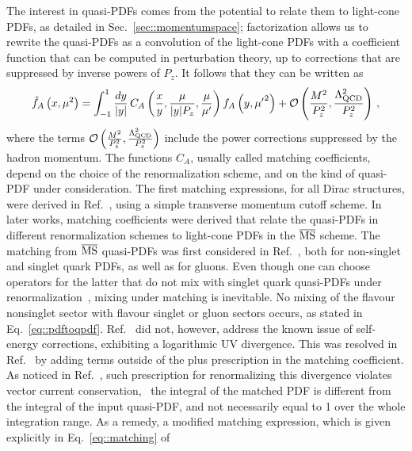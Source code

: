 The interest in quasi-PDFs comes from the potential to relate them to light-cone
PDFs, as detailed in Sec.~\ref{sec::momentumspace};
factorization allows us to rewrite the quasi-PDFs as a convolution of the
light-cone PDFs with a coefficient function that can be computed in perturbation
theory, up to corrections that are suppressed by inverse powers of $P_z$.
It follows that they can be written as
\begin{align}
	\label{eq::pdftoqpdf}                                                                             
	\tilde{f}_A\left( x , {\mu}^2 \right) =                                                               
	\int_{-1}^{1} \frac{dy}{|y|}\, C_A\left(\frac{x}{y},\frac{\mu}{|y|P_z},\frac{\mu}{\mu'} \right)  f_A\left( y, {\mu'}^2\right) 
	+ \mathcal{O}\left( \frac{M^2}{P_z^2},\frac{\Lambda^2_{\text{QCD}}}{P_z^2} \right)\, ,                   
\end{align}
where the terms $\mathcal{O}\left(
\frac{M^2}{P_z^2},\frac{\Lambda^2_{\text{QCD}}}{P_z^2} \right) $ include
the power corrections suppressed by the hadron momentum. The functions $C_A$,
usually called matching coefficients, depend on the choice of the
renormalization scheme, and on the kind of quasi-PDF under consideration. The
first matching expressions, for all Dirac structures, were derived in
Ref.~\cite{Xiong:2013bka}, using a simple transverse momentum cutoff scheme. In
later works, matching coefficients were derived that relate the quasi-PDFs in
different renormalization schemes to light-cone PDFs in the $\overline{\mathrm{MS}}$ scheme. The
matching from $\overline{\mathrm{MS}}$ quasi-PDFs was first considered in
Ref.~\cite{Wang:2017qyg}, both for non-singlet and singlet quark PDFs, as well
as for gluons. Even though one can choose operators for the latter that do not
mix with singlet quark quasi-PDFs under
renormalization~\cite{Zhang:2018diq,Li:2018tpe}, mixing under matching is
inevitable. 
No mixing of the flavour nonsinglet sector with flavour singlet or
gluon sectors occurs, as stated in Eq.~\eqref{eq::pdftoqpdf}. Ref.~\cite{Wang:2017qyg} did not, however, address the
known issue of self-energy corrections, exhibiting a logarithmic UV divergence.
This was resolved in Ref.~\cite{Izubuchi:2018srq} by adding terms outside of the
plus prescription in the matching coefficient. As noticed in
Ref.~\cite{Alexandrou:2018pbm}, such prescription for renormalizing this
divergence violates vector current conservation, \ie\ the integral of the
matched PDF is different from the integral of the input quasi-PDF, and not
necessarily equal to 1 over the whole integration range. As a remedy, a modified
matching expression, which is given explicitly in Eq.~\eqref{eq::matching} of
